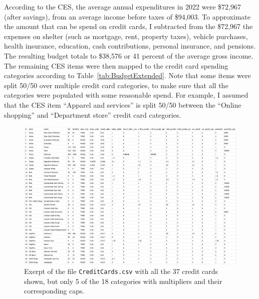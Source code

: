 According to the CES, the average annual expenditures in 2022 were \$72,967 (after savings), from an average income before taxes of \$94,003.
To approximate the amount that can be spend on credit cards, I subtracted from the \$72,967 the expenses on shelter (such as mortgage, rent, property taxes), vehicle purchases, health insurance, education, cash contributions, personal insurance, and pensions.
The resulting budget totals to \$38,576 or 41 percent of the average gross income. 
The remaining CES items were then mapped to the credit card spending categories according to Table~\ref{tab:BudgetExtended}. Note that some items were split 50/50 over multiple credit card categories, to make sure that all the categories were populated with some reasonable spend. For example, I assumed that the CES item ``Apparel and services'' is split 50/50 between the ``Online shopping'' and ``Department store'' credit card categories. 

\begin{landscape}
    \begin{figure}[t!h]
        \begin{center}
        \includegraphics[scale=0.5]{../Misc/CreditCardsCSV.png}
        \caption{Exerpt of the file \texttt{CreditCards.csv} with all the 37 credit cards shown, but only 5 of the 18 categories with multipliers and their corresponding caps.}
        \label{fig:CreditCardsCSV}
        \end{center}
    \end{figure}
        
    
\end{landscape}

